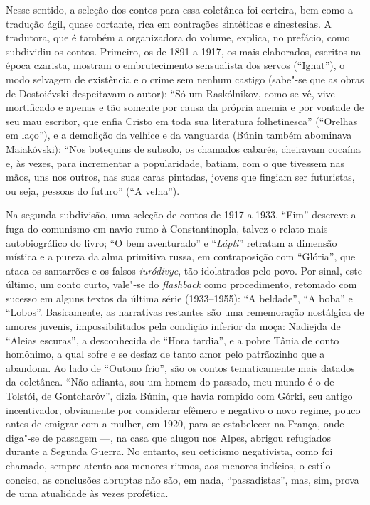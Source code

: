 Nesse sentido, a seleção dos contos para essa coletânea foi certeira, bem como a tradução ágil, quase cortante, rica em
contrações sintéticas e sinestesias. A tradutora, que é também
a organizadora do volume, explica, no prefácio, como subdividiu
os contos. Primeiro, os de 1891 a 1917, os mais elaborados,
escritos na época czarista, mostram o embrutecimento sensualista
dos servos (``Ignat''), o modo selvagem de existência e o crime
sem nenhum castigo (sabe"-se que as obras de Dostoiévski
despeitavam o autor): ``Só um Raskólnikov, como se vê, vive
mortificado e apenas e tão somente por causa da própria anemia
e por vontade de seu mau escritor, que enfia Cristo em toda sua
literatura folhetinesca'' (``Orelhas em laço''), e a demolição
da velhice e da vanguarda (Búnin também abominava Maiakóvski):
``Nos botequins de subsolo, os chamados cabarés, cheiravam
cocaína e, às vezes, para incrementar a popularidade, batiam,
com o que tivessem nas mãos, uns nos outros, nas suas caras
pintadas, jovens que fingiam ser futuristas, ou seja, pessoas
do futuro'' (``A velha''). 

Na segunda subdivisão, uma seleção de contos de 1917 a 1933.
``Fim'' descreve a fuga do comunismo em navio rumo à Constantinopla,
talvez o relato mais autobiográfico do livro; ``O bem aventurado''
e ``\emph{Lápti}'' retratam  a dimensão mística e a pureza da alma
primitiva russa, em contraposição com ``Glória'', que ataca os
santarrões e os falsos \emph{iuródivye}, tão idolatrados pelo
povo. Por sinal, este último, um conto curto, vale"-se do
\emph{flashback} como procedimento, retomado com sucesso em
alguns textos da última série (1933--1955): ``A beldade'',
``A boba'' e ``Lobos''. Basicamente, as narrativas restantes
são uma rememoração nostálgica de amores juvenis, impossibilitados
pela condição inferior da moça: Nadiejda de ``Aleias escuras'',
a desconhecida de ``Hora tardia'', e a pobre Tânia de conto
homônimo, a qual sofre e se desfaz de tanto amor pelo patrãozinho
que a abandona. Ao lado de ``Outono frio'', são os contos
tematicamente mais datados da coletânea. ``Não adianta, sou um
homem do passado, meu mundo é o de Tolstói, de Gontcharóv'',
dizia Búnin, que havia rompido com Górki, seu antigo incentivador,
obviamente por considerar efêmero e negativo o novo regime,
pouco antes de emigrar com a mulher, em 1920, para se estabelecer
na França, onde --- diga"-se de passagem ---,  na casa que
alugou nos Alpes, abrigou refugiados durante a Segunda Guerra.
No entanto, seu ceticismo negativista, como foi chamado, sempre
atento aos menores ritmos, aos menores indícios, o estilo conciso,
as conclusões abruptas não são, em nada, ``passadistas'', mas,
sim, prova de uma atualidade às vezes profética. 

